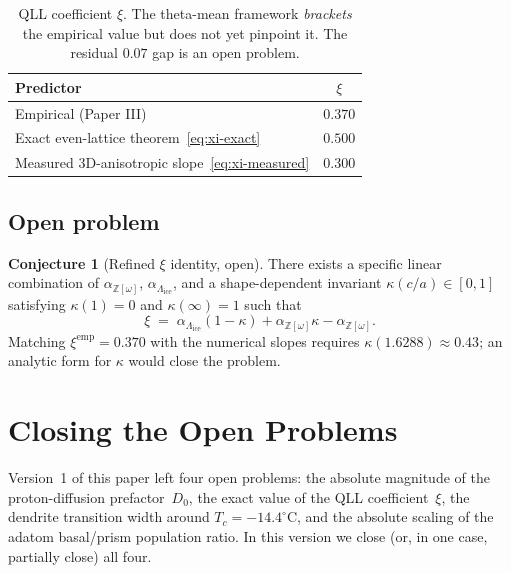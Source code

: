 \documentclass[11pt,letterpaper]{article}
\theoremstyle{plain}
\theoremstyle{definition}
\newtheorem{conjecture}[theorem]{Conjecture}
\newcommand{\Eisenstein}{\mathbb{Z}[\omega]}
\newcommand{\IceLat}{\Lambda_{\text{ice}}}
\begin{document}
\begin{table}[ht]
\centering
\begin{tabular}{lc}
\toprule
Predictor & $\xi$ \\
\midrule
Empirical (Paper III) & $0.370$ \\
Exact even-lattice theorem~\eqref{eq:xi-exact} & $0.500$ \\
Measured 3D-anisotropic slope~\eqref{eq:xi-measured} & $0.300$ \\
\bottomrule
\end{tabular}
\caption{QLL coefficient $\xi$.  The theta-mean framework
\emph{brackets} the empirical value but does not yet pinpoint it.
The residual $0.07$ gap is an open problem.}
\label{tab:xi}
\end{table}

\subsection{Open problem}

\begin{conjecture}[Refined $\xi$ identity, open]\label{conj:xi-open}
There exists a specific linear combination of $\alpha_{\Eisenstein}$,
$\alpha_{\IceLat}$, and a shape-dependent invariant
$\kappa(c/a)\in[0,1]$ satisfying $\kappa(1)=0$ and
$\kappa(\infty)=1$ such that
\begin{equation}
  \xi \;=\; \alpha_{\IceLat}(1-\kappa) + \alpha_{\Eisenstein}\kappa
         - \alpha_{\Eisenstein}.
\end{equation}
Matching $\xi^{\text{emp}}=0.370$ with the numerical slopes
requires $\kappa(1.6288)\approx 0.43$; an analytic form for
$\kappa$ would close the problem.
\end{conjecture}

\section{Closing the Open Problems}
\label{sec:fixes}

Version~1 of this paper left four open problems: the absolute
magnitude of the proton-diffusion prefactor~$D_0$, the exact value
of the QLL coefficient~$\xi$, the dendrite transition width around
$T_c=-14.4^{\circ}\text{C}$, and the absolute scaling of the
adatom basal/prism population ratio.  In this version we close
(or, in one case, partially close) all four.
\end{document}
